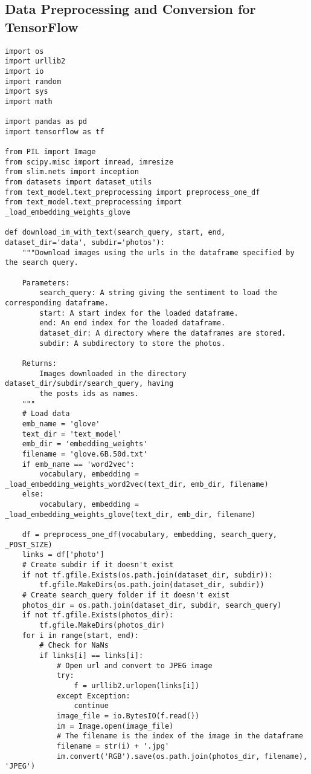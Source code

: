 \subsection{Data Preprocessing and Conversion for TensorFlow}
\begin{lstlisting}
import os
import urllib2
import io
import random
import sys
import math

import pandas as pd
import tensorflow as tf

from PIL import Image
from scipy.misc import imread, imresize
from slim.nets import inception
from datasets import dataset_utils
from text_model.text_preprocessing import preprocess_one_df
from text_model.text_preprocessing import _load_embedding_weights_glove

def download_im_with_text(search_query, start, end, dataset_dir='data', subdir='photos'):
    """Download images using the urls in the dataframe specified by the search query.

    Parameters:
        search_query: A string giving the sentiment to load the corresponding dataframe.
        start: A start index for the loaded dataframe.
        end: An end index for the loaded dataframe.
        dataset_dir: A directory where the dataframes are stored.
        subdir: A subdirectory to store the photos.

    Returns:
        Images downloaded in the directory dataset_dir/subdir/search_query, having 
        the posts ids as names.
    """
    # Load data
    emb_name = 'glove'
    text_dir = 'text_model'
    emb_dir = 'embedding_weights'
    filename = 'glove.6B.50d.txt'
    if emb_name == 'word2vec':
        vocabulary, embedding = _load_embedding_weights_word2vec(text_dir, emb_dir, filename)
    else:
        vocabulary, embedding = _load_embedding_weights_glove(text_dir, emb_dir, filename)

    df = preprocess_one_df(vocabulary, embedding, search_query, _POST_SIZE)
    links = df['photo']
    # Create subdir if it doesn't exist
    if not tf.gfile.Exists(os.path.join(dataset_dir, subdir)):
        tf.gfile.MakeDirs(os.path.join(dataset_dir, subdir))
    # Create search_query folder if it doesn't exist
    photos_dir = os.path.join(dataset_dir, subdir, search_query)
    if not tf.gfile.Exists(photos_dir):
        tf.gfile.MakeDirs(photos_dir)
    for i in range(start, end):
        # Check for NaNs
        if links[i] == links[i]:
            # Open url and convert to JPEG image
            try:
                f = urllib2.urlopen(links[i])
            except Exception:
                continue
            image_file = io.BytesIO(f.read())
            im = Image.open(image_file)
            # The filename is the index of the image in the dataframe
            filename = str(i) + '.jpg'
            im.convert('RGB').save(os.path.join(photos_dir, filename), 'JPEG')
            

\end{lstlisting}
